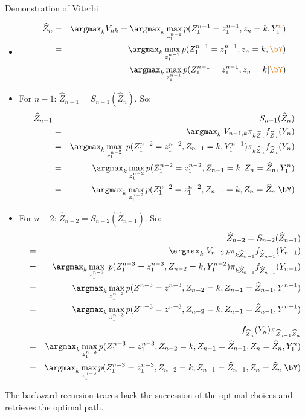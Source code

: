 \documentclass[compress,10pt]{beamer}
\begin{document}
\begin{frame}[allowframebreaks]{Demonstration of Viterbi}
\begin{itemize}
 \item 
 \begin{eqnarray*}
  \widehat{Z}_n &=& \argmax_k V_{nk} = \argmax_k \max_{z_1^{n-1}} p(Z_1^{n-1} = z_1^{n-1}, z_n = k, Y_1^{\textcolor{dgreen}{n}})\\
  &=& \argmax_k \max_{z_1^{n-1}} p(Z_1^{n-1} = z_1^{n-1}, z_n = k, \textcolor{dgreen}{\bY})\\
  &=&  \argmax_k \max_{z_1^{n-1}} p(Z_1^{n-1} = z_1^{n-1}, z_n = k | \textcolor{dgreen}{\bY})
 \end{eqnarray*}
\item  For $n-1$:  $\widehat{Z}_{n-1} = S_{n-1}(\widehat{Z}_{n}).$
So: 
 \begin{eqnarray*}
\widehat{Z}_{n-1} & = &S_{n-1}(\widehat{Z}_{n})\\
&=& \argmax_k \; V_{n-1, k} \pi_{k\widehat{Z}_{n}} f_{\widehat{Z}_{n}}(Y_{n})\\
&=&  \argmax_k \max_{z_1^{n-2}} \; p(Z_1^{n-2} = z_1^{n-2}, Z_{n-1} = k, Y_1^{n-1})\pi_{k\widehat{Z}_{n}} f_{\widehat{Z}_{n}}(Y_{n})\\
&=& \argmax_k \max_{z_1^{n-2}}p(Z_1^{n-2} = z_1^{n-2}, Z_{n-1} = k,Z_n = \widehat{Z}_{n},  Y_1^{n})\\
&=& \argmax_k \max_{z_1^{n-2}}p(Z_1^{n-2} = z_1^{n-2}, Z_{n-1} = k,Z_n = \widehat{Z}_{n} | \bY)\\
 \end{eqnarray*}
  
\item  For $n-2$:  $\widehat{Z}_{n-2} = S_{n-2}(\widehat{Z}_{n-1}).$
So: 
  \begin{eqnarray*}
&&\widehat{Z}_{n-2}  = S_{n-2}(\widehat{Z}_{n-1})\\
&=& \argmax_k \; V_{n-2, k} \pi_{k\widehat{Z}_{n-1}} f_{\widehat{Z}_{n-1}}(Y_{n-1})\\
&=&  \argmax_k \max_{z_1^{n-3}} \; p(Z_1^{n-3} = z_1^{n-3}, Z_{n-2} = k, Y_1^{n-2})\pi_{k\widehat{Z}_{n-1}} f_{\widehat{Z}_{n-1}}(Y_{n-1})\\&=& \argmax_k \max_{z_1^{n-3}}p(Z_1^{n-3} = z_1^{n-3}, Z_{n-2} = k,Z_{n-1} = \widehat{Z}_{n-1},  Y_1^{n-1})\\
&=&  \argmax_k \max_{z_1^{n-3}}p(Z_1^{n-3} = z_1^{n-3}, Z_{n-2} = k,Z_{n-1} = \widehat{Z}_{n-1},  Y_1^{n-1})\\
&&  \quad\quad \quad \quad\quad\quad \quad  \quad f_{\widehat{Z}_{n}}(Y_n)\pi_{\widehat{Z}_{n-1} \widehat{Z}_{n}}  \\
&=& \argmax_k \max_{z_1^{n-3}}p(Z_1^{n-3} = z_1^{n-3}, Z_{n-2} = k,Z_{n-1} = \widehat{Z}_{n-1}, Z_{n} = \widehat{Z}_{n},  Y_1^{n}) \\
&=&  \argmax_k \max_{z_1^{n-3}}p(Z_1^{n-3} = z_1^{n-3}, Z_{n-2} = k,Z_{n-1} = \widehat{Z}_{n-1}, Z_{n} = \widehat{Z}_{n} | \bY)
  \end{eqnarray*}
\end{itemize}
 
 
 
The backward recursion traces back the succession of the optimal choices and retrieves the optimal path. 

\end{frame}
\end{document}
